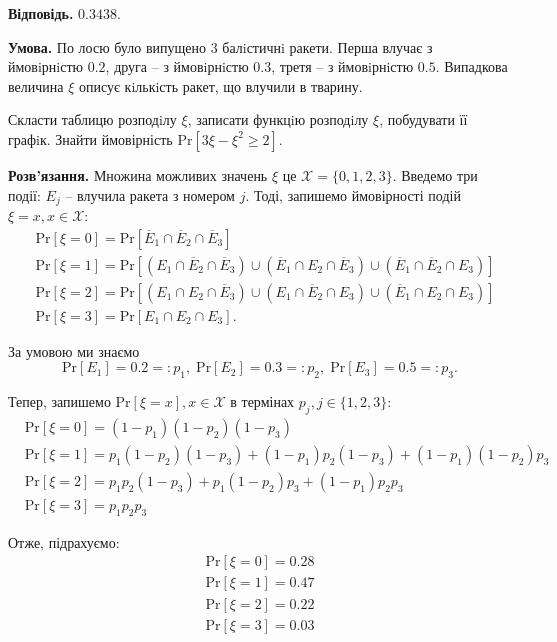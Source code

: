 \documentclass[oneside,solution]{karazin-prob-theory-assign}
\begin{document}
\textbf{Відповідь.} $0.3438$.


\hspace{20px}\textbf{Умова.} По лосю було випущено 3 балiстичнi ракети. Перша влучає з ймовiрнiстю $0.2$, друга -- з ймовiрнiстю $0.3$, третя -- з ймовiрнiстю $0.5$. Випадкова величина $\xi$ описує кiлькiсть ракет, що влучили в тварину. 

Скласти таблицю розподiлу $\xi$, записати функцiю розподiлу $\xi$,
побудувати її графiк. Знайти ймовірність $\text{Pr}[3\xi - \xi^2 \geq 2]$.

\textbf{Розв'язання.} Множина можливих значень $\xi$ це $\mathcal{X} = \{0, 1, 2, 3\}$. Введемо три події: $E_j$ -- влучила ракета з номером $j$. Тоді, запишемо ймовірності подій $\xi=x,x \in \mathcal{X}$:
\begin{align}
    &\text{Pr}[\xi=0] = \text{Pr}[\overline{E}_1 \cap \overline{E}_2 \cap \overline{E}_3] \\
    &\text{Pr}[\xi=1] = \text{Pr}[(E_1 \cap \overline{E}_2 \cap \overline{E}_3) \cup (\overline{E}_1 \cap E_2 \cap \overline{E}_3) \cup (\overline{E}_1 \cap \overline{E}_2 \cap E_3)] \\
    &\text{Pr}[\xi=2] = \text{Pr}[(E_1 \cap E_2 \cap \overline{E}_3) \cup (E_1 \cap \overline{E}_2 \cap E_3) \cup (\overline{E}_1 \cap E_2 \cap E_3)] \\
    &\text{Pr}[\xi=3] = \text{Pr}[E_1 \cap E_2 \cap E_3].
\end{align}

За умовою ми знаємо
\begin{equation}
    \text{Pr}[E_1] = 0.2 =: p_1, \; \text{Pr}[E_2] = 0.3 =: p_2, \; \text{Pr}[E_3] = 0.5 =: p_3.
\end{equation}

Тепер, запишемо $\text{Pr}[\xi=x],x\in \mathcal{X}$ в термінах $p_j,j \in \{1,2,3\}$:
\begin{align}
    &\text{Pr}[\xi=0] = (1-p_1)(1-p_2)(1-p_3) \\
    &\text{Pr}[\xi=1] = p_1(1-p_2)(1-p_3) + (1-p_1)p_2(1-p_3) + (1-p_1)(1-p_2)p_3 \\
    &\text{Pr}[\xi = 2] = p_1p_2(1-p_3) + p_1(1-p_2)p_3 + (1-p_1)p_2p_3 \\
    &\text{Pr}[\xi=3] = p_1p_2p_3
\end{align}

Отже, підрахуємо:
\begin{align}
    \text{Pr}[\xi=0] = 0.28 \\
    \text{Pr}[\xi=1] = 0.47\\
    \text{Pr}[\xi=2] = 0.22\\
    \text{Pr}[\xi=3] = 0.03
\end{align}
\end{document}
